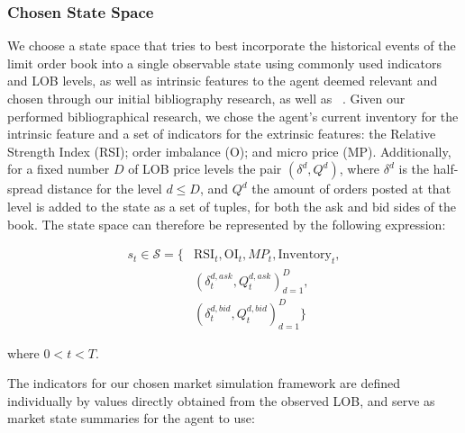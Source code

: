 \subsubsection{Chosen State Space}
We choose a state space that tries to best incorporate the historical events of the limit order book into a single observable state using commonly used indicators and LOB levels,
as well as intrinsic features to the agent deemed relevant and chosen through our initial bibliography research, as well as ~\cite{Gasperov2021}.
Given our performed bibliographical research, we chose the agent's current inventory for the intrinsic feature and a set of indicators for the extrinsic features:
the Relative Strength Index (RSI); order imbalance (O); and micro price (MP).
Additionally, for a fixed number $D$ of LOB price levels the pair $(\delta^d, Q^d)$, where $\delta^d$ is the half-spread distance for the level $d \leq D$,
and $Q^d$ the amount of orders posted at that level is added to the state as a set of tuples, for both the ask and bid sides of the book.
The state space can therefore be represented by the following expression:

\begin{equation}
    \begin{aligned}
        s_{t} \in \mathcal{S} = \big\{ &\text{RSI}_t, \text{OI}_t, MP_{t}, \text{Inventory}_t, \\
        & (\delta_t^{d, ask}, Q_t^{d, ask})_{d=1}^{D}, \\
        & (\delta_t^{d, bid}, Q_t^{d, bid})_{d=1}^{D} \big\}
    \end{aligned}\label{eq:equation}
\end{equation}

where $0 < t < T$.

The indicators for our chosen market simulation framework are defined individually by values directly obtained from the observed LOB,
and serve as market state summaries for the agent to use:

